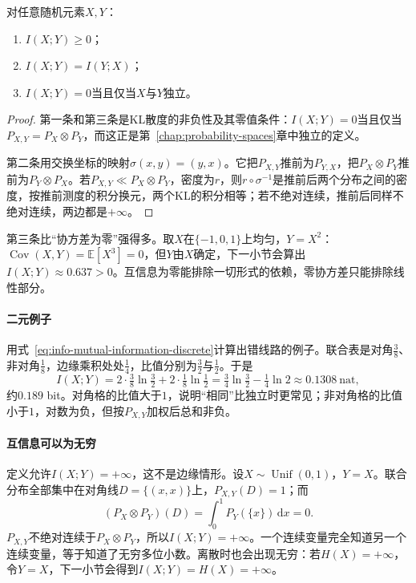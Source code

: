 \begin{theorem}[互信息的基本性质]
\label{thm:info-mi-basic}
对任意随机元素$X,Y$：
\begin{enumerate}
  \item $I(X;Y)\geq0$；
  \item $I(X;Y)=I(Y;X)$；
  \item $I(X;Y)=0$当且仅当$X$与$Y$独立。
\end{enumerate}
\end{theorem}

\begin{proof}
第一条和第三条是KL散度的非负性及其零值条件：$I(X;Y)=0$当且仅当$P_{X,Y}=P_X\otimes P_Y$，而这正是第~\ref{chap:probability-spaces}章中独立的定义。

第二条用交换坐标的映射$\sigma(x,y)=(y,x)$。它把$P_{X,Y}$推前为$P_{Y,X}$，把$P_X\otimes P_Y$推前为$P_Y\otimes P_X$。若$P_{X,Y}\ll P_X\otimes P_Y$，密度为$r$，则$r\circ\sigma^{-1}$是推前后两个分布之间的密度，按推前测度的积分换元，两个KL的积分相等；若不绝对连续，推前后同样不绝对连续，两边都是$+\infty$。
\end{proof}

第三条比“协方差为零”强得多。取$X$在$\{-1,0,1\}$上均匀，$Y=X^{2}$：$\operatorname{Cov}(X,Y)=\mathbb{E}[X^{3}]=0$，但$Y$由$X$确定，下一小节会算出$I(X;Y)\approx0.637>0$。互信息为零能排除一切形式的依赖，零协方差只能排除线性部分。

\paragraph{二元例子}
用式~\eqref{eq:info-mutual-information-discrete}计算出错线路的例子。联合表是对角$\tfrac38$、非对角$\tfrac18$，边缘乘积处处$\tfrac14$，比值分别为$\tfrac32$与$\tfrac12$。于是
\[
  I(X;Y)=2\cdot\tfrac38\ln\tfrac32+2\cdot\tfrac18\ln\tfrac12=\tfrac34\ln\tfrac32-\tfrac14\ln2\approx0.1308\ \mathrm{nat},
\]
约$0.189$ bit。对角格的比值大于$1$，说明“相同”比独立时更常见；非对角格的比值小于$1$，对数为负，但按$P_{X,Y}$加权后总和非负。

\paragraph{互信息可以为无穷}
定义允许$I(X;Y)=+\infty$，这不是边缘情形。设$X\sim\operatorname{Unif}(0,1)$，$Y=X$。联合分布全部集中在对角线$D=\{(x,x)\}$上，$P_{X,Y}(D)=1$；而
\[
  (P_X\otimes P_Y)(D)=\int_0^1P_Y(\{x\})\,\mathrm{d}x=0.
\]
$P_{X,Y}$不绝对连续于$P_X\otimes P_Y$，所以$I(X;Y)=+\infty$。一个连续变量完全知道另一个连续变量，等于知道了无穷多位小数。离散时也会出现无穷：若$H(X)=+\infty$，令$Y=X$，下一小节会得到$I(X;Y)=H(X)=+\infty$。

